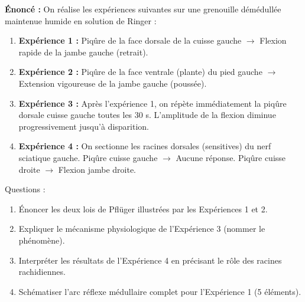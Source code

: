 \documentclass[11pt]{article}
\begin{document}
\begin{exoresolu}
\textbf{Énoncé :} On réalise les expériences suivantes sur une grenouille démédullée maintenue humide en solution de Ringer :
\begin{enumerate}
    \item \textbf{Expérience 1 :} Piqûre de la face dorsale de la cuisse gauche $\rightarrow$ Flexion rapide de la jambe gauche (retrait).
    \item \textbf{Expérience 2 :} Piqûre de la face ventrale (plante) du pied gauche $\rightarrow$ Extension vigoureuse de la jambe gauche (poussée).
    \item \textbf{Expérience 3 :} Après l'expérience 1, on répète immédiatement la piqûre dorsale cuisse gauche toutes les 30 s. L'amplitude de la flexion diminue progressivement jusqu'à disparition.
    \item \textbf{Expérience 4 :} On sectionne les racines dorsales (sensitives) du nerf sciatique gauche. Piqûre cuisse gauche $\rightarrow$ Aucune réponse. Piqûre cuisse droite $\rightarrow$ Flexion jambe droite.
\end{enumerate}
Questions :
\begin{enumerate}
    \item Énoncer les deux lois de Pflüger illustrées par les Expériences 1 et 2.
    \item Expliquer le mécanisme physiologique de l'Expérience 3 (nommer le phénomène).
    \item Interpréter les résultats de l'Expérience 4 en précisant le rôle des racines rachidiennes.
    \item Schématiser l'arc réflexe médullaire complet pour l'Expérience 1 (5 éléments).
\end{enumerate}


\end{exoresolu}
\end{document}
